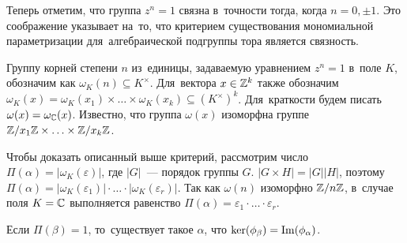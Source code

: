 \documentclass{article}
\begin{document}
Теперь отметим, что группа $z^n = 1$ связна в~точности тогда, когда $n = 0, \pm 1$.
Это соображение указывает на~то, что критерием существования мономиальной параметризации
для~алгебраической подгруппы тора является связность.

Группу корней степени $n$ из~единицы, задаваемую уравнением $z^n = 1$ в~поле $K$, обозначим как $\omega_K(n) \subseteq K^\times$.
Для~вектора $x \in \mathbb{Z}^k$ также обозначим $\omega_K(x) = \omega_K(x_1) \times \ldots \times \omega_K(x_k) \subseteq (K^\times)^k$.
Для~краткости будем писать $\omega(x) = \omega_{\mathbb{C}}(x)$. Известно, что группа $\omega(x)$ изоморфна
группе $\mathbb{Z} / x_1 \mathbb{Z} \times \ldots \times \mathbb{Z} / x_k \mathbb{Z}$.

Чтобы доказать описанный выше критерий, рассмотрим число $\Pi(\alpha) = |\omega_K(\varepsilon)|$, где $|G|$~— порядок группы $G$.
$|G \times H| = |G| |H|$, поэтому $\Pi(\alpha) = |\omega_K(\varepsilon_1)| \cdot \ldots \cdot |\omega_K(\varepsilon_r)|$.
Так как $\omega(n)$ изоморфно $\mathbb{Z} / n \mathbb{Z}$, в~случае поля $K = \mathbb{C}$ выполняется
равенство $\Pi(\alpha) = \varepsilon_1 \cdot \ldots \cdot \varepsilon_r$.

\begin{lemma}
\label{lemma:exactOutOfPi}
    Если $\Pi(\beta) = 1$, то~существует такое $\alpha$, что $\ker(\phi_\beta) = \mathrm{Im}(\phi_\alpha)$.
\end{lemma}
\end{document}
